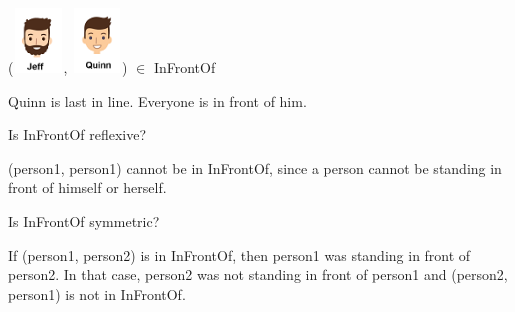 \documentclass{ximera}
\begin{document}
\begin{exercise}



 ({\includegraphics[width=50px,height=65px]{pics/people/jeff.png}}, {\includegraphics[width=50px,height=65px]{pics/people/quinn.png}}) $\in$ InFrontOf 

  \begin{multipleChoice}
  \end{multipleChoice}
  \begin{feedback}
Quinn is last in line. Everyone is in front of him.
  \end{feedback}
\end{exercise}



\begin{exercise}
Is InFrontOf reflexive?

  \begin{multipleChoice}
  \end{multipleChoice}
  \begin{feedback}
  (person1, person1) cannot be in InFrontOf, since a person cannot be standing in front of himself or herself.
  \end{feedback}
\end{exercise}




\begin{exercise}
Is InFrontOf symmetric?

  \begin{multipleChoice}
  \end{multipleChoice}
  \begin{feedback}
  If (person1, person2) is in InFrontOf, then person1 was standing in front of person2.  In that case, person2 was not standing in front of person1 and (person2, person1) is not in InFrontOf.
  \end{feedback}
\end{exercise}
\end{document}
